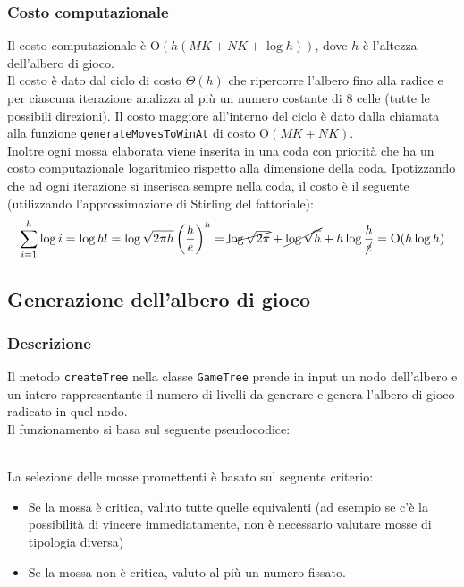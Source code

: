 \documentclass[11pt]{article}
\begin{document}
\subsubsection*{Costo computazionale}
Il costo computazionale è O$(h(MK+NK+\log h))$, dove $h$ è l'altezza dell'albero di gioco.\\
Il costo è dato dal ciclo di costo $\Theta(h)$ che ripercorre l'albero fino alla radice e per ciascuna iterazione analizza al più un numero costante di 8 celle (tutte le possibili direzioni). Il costo maggiore all'interno del ciclo è dato dalla chiamata alla funzione \texttt{generateMovesToWinAt} di costo O$(MK+NK)$.\\
Inoltre ogni mossa elaborata viene inserita in una coda con priorità che ha un costo computazionale logaritmico rispetto alla dimensione della coda. Ipotizzando che ad ogni iterazione si inserisca sempre nella coda, il costo è il seguente (utilizzando l'approssimazione di Stirling del fattoriale):
\begin{align*}
\sum_{i=1}^{h} \log i = \log h! = \log \sqrt{2\pi h} \left(\dfrac{h}{e}\right)^h = \cancel{\log \sqrt{2 \pi}} + \cancel{\log \sqrt{h}} + h \log \dfrac{h}{\cancel{e}} = \text{O}(h \log h)
\end{align*}

\subsection*{Generazione dell'albero di gioco}
\subsubsection*{Descrizione}
Il metodo \texttt{createTree} nella classe \texttt{GameTree} prende in input un nodo dell'albero e un intero rappresentante il numero di livelli da generare e genera l'albero di gioco radicato in quel nodo.\\
Il funzionamento si basa sul seguente pseudocodice:
\begin{algorithm*}
\SetAlgoLined
{}
\end{algorithm*}\\
La selezione delle mosse promettenti è basato sul seguente criterio:
\begin{itemize}
\setlength\itemsep{0.05cm}
	\item Se la mossa è critica, valuto tutte quelle equivalenti (ad esempio se c'è la possibilità di vincere immediatamente, non è necessario valutare mosse di tipologia diversa)
	\item Se la mossa non è critica, valuto al più un numero fissato.
\end{itemize}
\end{document}
